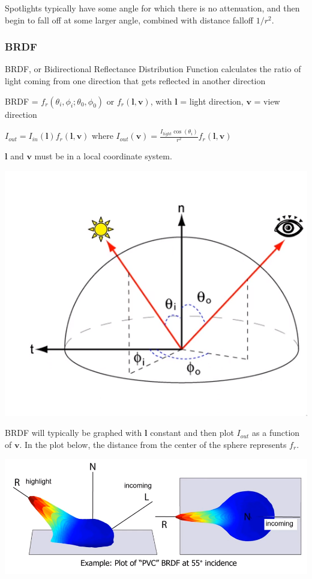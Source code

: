 \documentclass[12pt]{article}
\begin{document}
Spotlights typically have some angle for which there is no attenuation,
and then begin to fall off at some larger angle, combined with distance
falloff $1/r^2$.

\subsubsection{BRDF}

BRDF, or Bidirectional Reflectance Distribution Function calculates
the ratio of light coming from one direction that gets reflected
in another direction

BRDF = $f_r(\theta_i,\phi_i;\theta_0,\phi_0)$ or $f_r(\bm l,
\bm v)$, with $\bm l$ = light direction, $\bm v$ = view direction

$I_{out} = I_{in}(\bm l) f_r(\bm l, \bm v)$ where $I_{out}(\bm v)
= \frac{I_{light} \cos(\theta_i)}{r^2} f_r(\bm l,\bm v)$

$\bm l$ and $\bm v$ must be in a local coordinate system.

\includegraphics[scale=2]{images/brdf.png}

BRDF will typically be graphed with $\bm l$ constant and then
plot $I_{out}$ as a function of $\bm v$. In the plot below, the distance
from the center of the sphere represents $f_r$.

\includegraphics[scale=2]{images/brdf-plot.png}
\end{document}

